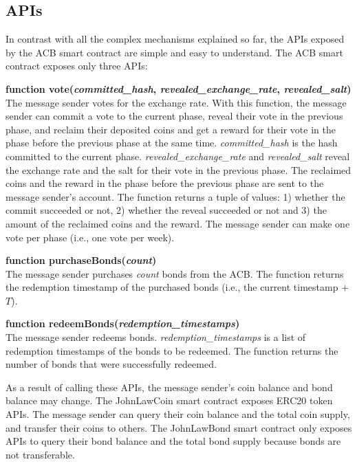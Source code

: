 \documentclass[dvipdfmx,a4paper]{article}
\begin{document}
\subsection{APIs}

In contrast with all the complex mechanisms explained so far, the APIs exposed by the ACB smart contract are simple and easy to understand. The ACB smart contract exposes only three APIs:

\begin{description}
\item{\textbf{function vote(\textit{committed\_hash}, \textit{revealed\_exchange\_rate}, \textit{revealed\_salt})}}\\
The message sender votes for the exchange rate. With this function, the message sender can commit a vote to the current phase, reveal their vote in the previous phase, and reclaim their deposited coins and get a reward for their vote in the phase before the previous phase at the same time. \textit{committed\_hash} is the hash committed to the current phase. \textit{revealed\_exchange\_rate} and \textit{revealed\_salt} reveal the exchange rate and the salt for their vote in the previous phase. The reclaimed coins and the reward in the phase before the previous phase are sent to the message sender's account. The function returns a tuple of values: 1) whether the commit succeeded or not, 2) whether the reveal succeeded or not and 3) the amount of the reclaimed coins and the reward. The message sender can make one vote per phase (i.e., one vote per week).
\item{\textbf{function purchaseBonds(\textit{count})}}\\
The message sender purchases \textit{count} bonds from the ACB. The function returns the redemption timestamp of the purchased bonds (i.e., the current timestamp $+$ $T$).
\item{\textbf{function redeemBonds(\textit{redemption\_timestamps})}}\\
The message sender redeems bonds. \textit{redemption\_timestamps} is a list of redemption timestamps of the bonds to be redeemed. The function returns the number of bonds that were successfully redeemed.
\end{description}

As a result of calling these APIs, the message sender's coin balance and bond balance may change. The JohnLawCoin smart contract exposes ERC20 token APIs. The message sender can query their coin balance and the total coin supply, and transfer their coins to others. The JohnLawBond smart contract only exposes APIs to query their bond balance and the total bond supply because bonds are not transferable.
\end{document}
